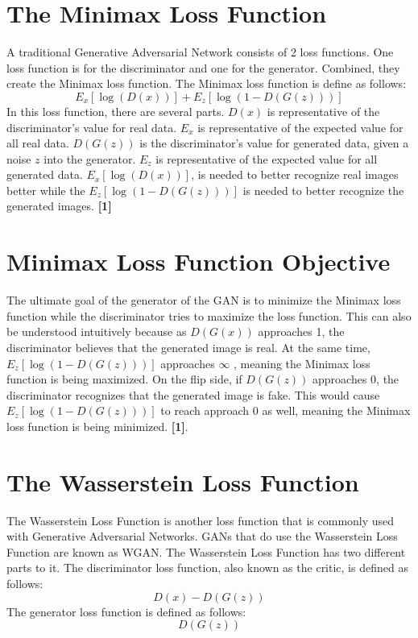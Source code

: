 \documentclass{cup-pan}
\begin{document}
\section{The Minimax Loss Function}

A traditional Generative Adversarial Network consists of 2 loss functions. One loss function is for the discriminator and one for the generator. Combined, they create the Minimax loss function. The Minimax loss function is define as follows:
\begin{equation}
E_x[\log (D(x))] + E_z[\log (1 - D(G(z)))] 
\end{equation}
In this loss function, there are several parts. $D(x)$ is representative of the discriminator's value for real data. $E_x$ is representative of the expected value for all real data. $D(G(z))$ is the discriminator's value for generated data, given a noise $z$ into the generator. $E_z$ is representative of the expected value for all generated data. $E_x[\log (D(x))]$, is needed to better recognize real images better while the $ E_z[\log (1 - D(G(z)))]$ is needed to better recognize the generated images. \textbf{[1]}

\section{Minimax Loss Function Objective}
The ultimate goal of the generator of the GAN is to minimize the Minimax loss function while the discriminator tries to maximize the loss function. This can also be understood intuitively because as $D(G(x))$ approaches 1, the discriminator believes that the generated image is real. At the same time, $E_z[\log (1 - D(G(z)))]$ approaches $\infty$ , meaning the Minimax loss function is being maximized. On the flip side, if $D(G(z))$ approaches 0, the discriminator recognizes that the generated image is fake. This would cause $E_z[\log (1 - D(G(z)))]$ to reach approach 0 as well, meaning the Minimax loss function is being minimized. \textbf{[1]}.

\section{The Wasserstein Loss Function}

The Wasserstein Loss Function is another loss function that is commonly used with Generative Adversarial Networks. GANs that do use the Wasserstein Loss Function are known as WGAN. The Wasserstein Loss Function has two different parts to it. The discriminator loss function, also known as the critic, is defined as follows:
\begin{equation}
D(x) - D(G(z))
\end{equation}
The generator loss function is defined as follows:
\begin{equation}
D(G(z))
\end{equation}
\end{document}
